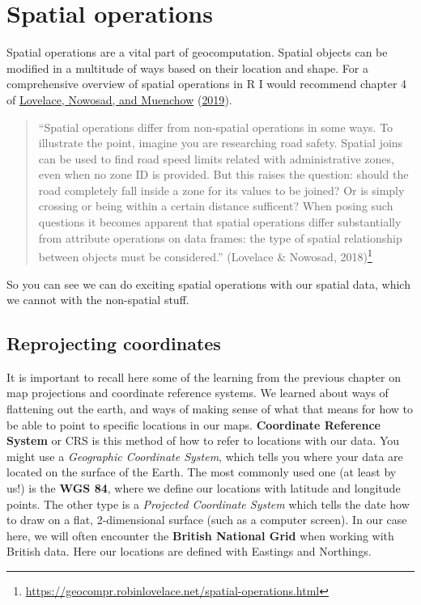 \documentclass[
  krantz2]{krantz}
\renewcommand{\href}[2]{#2\footnote{\url{#1}}}
\begin{document}
\hypertarget{spatial-operations}{%
\section{Spatial operations}\label{spatial-operations}}

Spatial operations are a vital part of geocomputation. Spatial objects can be modified in a multitude of ways based on their location and shape. For a comprehensive overview of spatial operations in R I would recommend chapter 4 of \protect\hyperlink{ref-Lovelace_2019}{Lovelace, Nowosad, and Muenchow} (\protect\hyperlink{ref-Lovelace_2019}{2019}).

\begin{quote}
``Spatial operations differ from non-spatial operations in some ways. To illustrate the point, imagine you are researching road safety. Spatial joins can be used to find road speed limits related with administrative zones, even when no zone ID is provided. But this raises the question: should the road completely fall inside a zone for its values to be joined? Or is simply crossing or being within a certain distance sufficent? When posing such questions it becomes apparent that spatial operations differ substantially from attribute operations on data frames: the type of spatial relationship between objects must be considered.'' \href{https://geocompr.robinlovelace.net/spatial-operations.html}{(Lovelace \& Nowosad, 2018)}
\end{quote}

So you can see we can do exciting spatial operations with our spatial data, which we cannot with the non-spatial stuff.

\hypertarget{reprojecting-coordinates}{%
\subsection{Reprojecting coordinates}\label{reprojecting-coordinates}}

It is important to recall here some of the learning from the previous chapter on map projections and coordinate reference systems. We learned about ways of flattening out the earth, and ways of making sense of what that means for how to be able to point to specific locations in our maps. \textbf{Coordinate Reference System} or CRS is this method of how to refer to locations with our data. You might use a \emph{Geographic Coordinate System}, which tells you where your data are located on the surface of the Earth. The most commonly used one (at least by us!) is the \textbf{WGS 84}, where we define our locations with latitude and longitude points. The other type is a \emph{Projected Coordinate System} which tells the date how to draw on a flat, 2-dimensional surface (such as a computer screen). In our case here, we will often encounter the \textbf{British National Grid} when working with British data. Here our locations are defined with Eastings and Northings.
\end{document}
